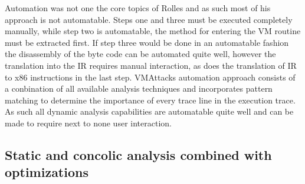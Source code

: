 \documentclass[10pt,twoside,a4paper,bibliography=totoc]{scrbook}
\begin{document}
Automation was not one the core topics of Rolles and as such most of his approach is not automatable. Steps one and three must be executed completely manually, while step two is automatable, the method for entering the VM routine must be extracted first. If step three would be done in an automatable fashion the disassembly of the byte code can be automated quite well, however the translation into the IR requires manual interaction, as does the translation of IR to x86 instructions in the last step. 
VMAttacks automation approach consists of a conbination of all available analysis techniques and incorporates pattern matching to determine the importance of every trace line in the execution trace. As such all dynamic analysis capabilities are automatable quite well and can be made to require next to none user interaction.   

\subsection{Static and concolic analysis combined with optimizations}
\end{document}

